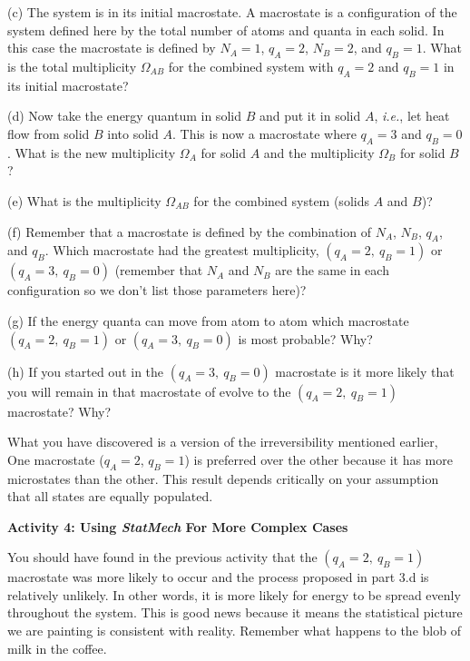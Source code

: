 (c) The system is in its initial macrostate.
A macrostate is a configuration of the system defined here by the total number
of atoms and quanta in each solid.
In this case the macrostate is defined by $N_A=1$, $q_A=2$, $N_B=2$, and $q_B= 1$.
 What is the total multiplicity $\Omega_{AB}$ for the combined system
with $q_A=2$ and $q_B=1$ in its initial macrostate?
\vspace{15mm}

(d) Now take the energy quantum in solid $B$ and put it in solid $A$,
{\it i.e.}, let heat flow from solid $B$ into solid $A$.
This is now a macrostate where $q_A=3$ and $q_B=0$.
What is the new multiplicity $\Omega_A$ for solid $A$ and the  multiplicity $\Omega_B$ for solid $B$?
\vspace{20mm}

(e) What is the multiplicity $\Omega_{AB}$ for the combined system (solids $A$ and $B$)?
\vspace{15mm}

(f) Remember that a macrostate is defined by the combination of $N_A$, $N_B$, $q_A$, and $q_B$.
Which macrostate had the greatest multiplicity, $(q_A=2, ~ q_B=1)$ or $(q_A=3, ~ q_B=0)$
(remember that $N_A$ and $N_B$ are the same in each configuration so we don't 
list those parameters here)?
\vspace{15mm}

(g) If the energy quanta can move from atom to atom
which macrostate $(q_A=2, ~ q_B=1)$ or $(q_A=3, ~ q_B=0)$ is most probable? Why?
\vspace{15mm}

(h) If you started out in the $(q_A=3, ~ q_B=0)$ macrostate is it more likely that you will remain
in that macrostate of evolve to the $(q_A=2, ~ q_B=1)$ macrostate? Why?
\vspace{15mm}

What you have discovered is a version of the irreversibility mentioned earlier,
One macrostate ($q_A=2$, $q_B=1$) is preferred over the other because it has more microstates
than the other.
This result depends critically on your assumption that all states are equally populated.

\newpage

\textbf{Activity 4: Using {\it StatMech} For More Complex Cases}

You should have found in the previous activity that the $(q_A=2, ~ q_B=1)$ 
macrostate was more likely
to occur and the process proposed in part 3.d is relatively unlikely.
In other words, it is more likely for energy to be spread evenly throughout the system.
This is good news because it means the statistical picture we are painting is consistent
with reality.
Remember what happens to the blob of milk in the coffee.

